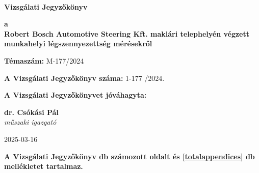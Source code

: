 \documentclass[a4paper,12pt]{article}
\begin{document}
	
	
	\thispagestyle{firstpage}
	
	\begin{flushleft}
		{\footnotesize  
			\textbf{
				 \\
				\vspace{-2mm} 
			}
		}
	\end{flushleft}
	
	\vfill
	
	\begin{center}
		{\Huge \textbf{Vizsgálati Jegyzőkönyv}}
	\end{center}
	
	\vfill
	
	\begin{center}
		\large
		\textbf{a} \\
		\textbf{Robert Bosch Automotive Steering Kft. maklári telephelyén
végzett munkahelyi légszennyezettség mérésekről}
	\end{center}
	
	\vfill
	
	\begin{center}
		\textbf{Témaszám:} M-177/2024
	\end{center}    
	
	\vfill
	
	\begin{center}
		\textbf{A Vizsgálati Jegyzőkönyv száma:} 1-177 /2024.
	\end{center}
	
	\begin{center}
		\textbf{A Vizsgálati Jegyzőkönyvet jóváhagyta:}
	\end{center}    
	
	\vfill
	
	\begin{center}
		\textbf{dr. Csókási Pál}\\
		\textit{műszaki igazgató} \\
	\end{center}    
	
	\vfill
	
	\begin{center}
		2025-03-16
	\end{center}    
	
	\vfill
	
	\begin{center}
		\textbf{A Vizsgálati Jegyzőkönyv \pageref{LastPage} db számozott oldalt és \ref{totalappendices} db mellékletet tartalmaz.}
	\end{center}    
	
\end{document}
